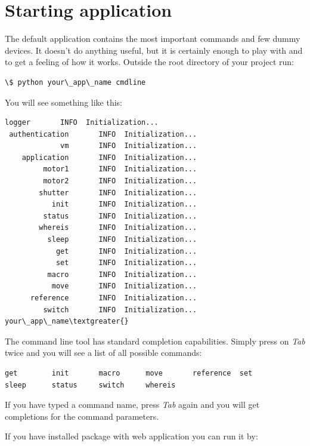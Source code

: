 \documentclass[letterpaper,10pt,english]{sphinxmanual}
\begin{document}
\section{Starting application}
\label{tutorial:starting-application}
The default application contains the most important commands and few dummy devices.
It doesn't do anything useful, but it is certainly enough to play with and to get a feeling of
how it works.
Outside the root directory of your project run:

\begin{Verbatim}[commandchars=\\\{\}]
\$ python your\_app\_name cmdline
\end{Verbatim}

You will see something like this:

\begin{Verbatim}[commandchars=\\\{\}]
 logger       INFO  Initialization...
 authentication       INFO  Initialization...
             vm       INFO  Initialization...
    application       INFO  Initialization...
         motor1       INFO  Initialization...
         motor2       INFO  Initialization...
        shutter       INFO  Initialization...
           init       INFO  Initialization...
         status       INFO  Initialization...
        whereis       INFO  Initialization...
          sleep       INFO  Initialization...
            get       INFO  Initialization...
            set       INFO  Initialization...
          macro       INFO  Initialization...
           move       INFO  Initialization...
      reference       INFO  Initialization...
         switch       INFO  Initialization...
your\_app\_name\textgreater{}
\end{Verbatim}

The command line tool has standard completion capabilities. Simply press on \emph{Tab} twice and you will see a list
of all possible commands:

\begin{Verbatim}[commandchars=\\\{\}]
get        init       macro      move       reference  set        sleep      status     switch     whereis
\end{Verbatim}

If you have typed a command name, press \emph{Tab} again and you will get completions
for the command parameters.

If you have installed package with web application you can run it by:
\end{document}
